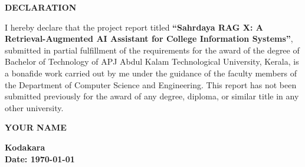 \documentclass[12pt,a4paper]{report}
\begin{document}
\begin{titlepage}
\onehalfspacing
\begin{center}
{\fontsize{16}{10}\selectfont\textbf{DECLARATION}}\\
\end{center}

I hereby declare that the project report titled \textbf{``Sahrdaya RAG X: A Retrieval-Augmented AI Assistant for College Information Systems''}, submitted in partial fulfillment of the requirements for the award of the degree of Bachelor of Technology of APJ Abdul Kalam Technological University, Kerala, is a bonafide work carried out by me under the guidance of the faculty members of the Department of Computer Science and Engineering. This report has not been submitted previously for the award of any degree, diploma, or similar title in any other university.

\begin{flushright}
\singlespacing
\textbf{YOUR NAME} \\
\vspace{20pt}
\end{flushright}

\begin{flushleft}
\textbf{Kodakara}\\
\textbf{Date: \today}
\end{flushleft}
\end{titlepage}
\end{document}
